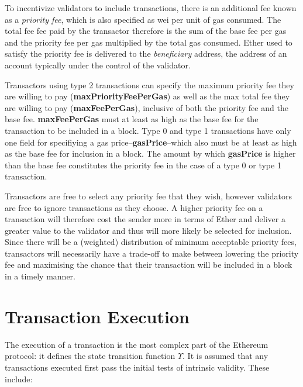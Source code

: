 \documentclass[9pt,oneside]{amsart}
\begin{document}
\begin{multicols}{2}
To incentivize validators to include transactions, there is an additional fee known as a \textit{priority fee}, which is also specified as wei per unit of gas consumed. The total fee fee paid by the transactor therefore is the sum of the base fee per gas and the priority fee per gas multiplied by the total gas consumed. Ether used to satisfy the priority fee is delivered to the \textit{beneficiary} address, the address of an account typically under the control of the validator.

Transactors using type 2 transactions can specify the maximum priority fee they are willing to pay (\textbf{maxPriorityFeePerGas}) as well as the max total fee they are willing to pay (\textbf{maxFeePerGas}), inclusive of both the priority fee and the base fee. \textbf{maxFeePerGas} must at least as high as the base fee for the transaction to be included in a block. Type 0 and type 1 transactions have only one field for specifiying a gas price--\textbf{gasPrice}--which also must be at least as high as the base fee for inclusion in a block. The amount by which \textbf{gasPrice} is higher than the base fee constitutes the priority fee in the case of a type 0 or type 1 transaction.

Transactors are free to select any priority fee that they wish, however validators are free to ignore transactions as they choose. A higher priority fee on a transaction will therefore cost the sender more in terms of Ether and deliver a greater value to the validator and thus will more likely be selected for inclusion. Since there will be a (weighted) distribution of minimum acceptable priority fees, transactors will necessarily have a trade-off to make between lowering the priority fee and maximising the chance that their transaction will be included in a block in a timely manner.


\section{Transaction Execution} \label{ch:transactions}

The execution of a transaction is the most complex part of the Ethereum protocol: it defines the state transition function \hyperlink{Upsilon_state_transition}{$\Upsilon$}. It is assumed that any transactions executed first pass the initial tests of intrinsic validity. These include:


\end{multicols}
\end{document}
